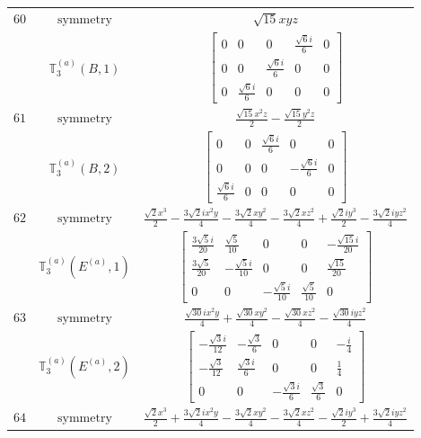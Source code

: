 \documentclass[fleqn,8pt,landscape]{jsarticle}
\begin{document}
\begin{longtable}{ccc}
$ 60 $ & $ \text{symmetry} $ & $ \sqrt{15} x y z $ \\
$  $ & $ \mathbb{T}_{3}^{(a)}(B,1) $ & $ \begin{bmatrix} 0 & 0 & 0 & \frac{\sqrt{6} i}{6} & 0 \\ 0 & 0 & \frac{\sqrt{6} i}{6} & 0 & 0 \\ 0 & \frac{\sqrt{6} i}{6} & 0 & 0 & 0 \end{bmatrix} $ \\ \hline
$ 61 $ & $ \text{symmetry} $ & $ \frac{\sqrt{15} x^{2} z}{2} - \frac{\sqrt{15} y^{2} z}{2} $ \\
$  $ & $ \mathbb{T}_{3}^{(a)}(B,2) $ & $ \begin{bmatrix} 0 & 0 & \frac{\sqrt{6} i}{6} & 0 & 0 \\ 0 & 0 & 0 & - \frac{\sqrt{6} i}{6} & 0 \\ \frac{\sqrt{6} i}{6} & 0 & 0 & 0 & 0 \end{bmatrix} $ \\ \hline
$ 62 $ & $ \text{symmetry} $ & $ \frac{\sqrt{2} x^{3}}{2} - \frac{3 \sqrt{2} i x^{2} y}{4} - \frac{3 \sqrt{2} x y^{2}}{4} - \frac{3 \sqrt{2} x z^{2}}{4} + \frac{\sqrt{2} i y^{3}}{2} - \frac{3 \sqrt{2} i y z^{2}}{4} $ \\
$  $ & $ \mathbb{T}_{3}^{(a)}(E^{(a)},1) $ & $ \begin{bmatrix} \frac{3 \sqrt{5} i}{20} & \frac{\sqrt{5}}{10} & 0 & 0 & - \frac{\sqrt{15} i}{20} \\ \frac{3 \sqrt{5}}{20} & - \frac{\sqrt{5} i}{10} & 0 & 0 & \frac{\sqrt{15}}{20} \\ 0 & 0 & - \frac{\sqrt{5} i}{10} & \frac{\sqrt{5}}{10} & 0 \end{bmatrix} $ \\ \hline
$ 63 $ & $ \text{symmetry} $ & $ \frac{\sqrt{30} i x^{2} y}{4} + \frac{\sqrt{30} x y^{2}}{4} - \frac{\sqrt{30} x z^{2}}{4} - \frac{\sqrt{30} i y z^{2}}{4} $ \\
$  $ & $ \mathbb{T}_{3}^{(a)}(E^{(a)},2) $ & $ \begin{bmatrix} - \frac{\sqrt{3} i}{12} & - \frac{\sqrt{3}}{6} & 0 & 0 & - \frac{i}{4} \\ - \frac{\sqrt{3}}{12} & \frac{\sqrt{3} i}{6} & 0 & 0 & \frac{1}{4} \\ 0 & 0 & - \frac{\sqrt{3} i}{6} & \frac{\sqrt{3}}{6} & 0 \end{bmatrix} $ \\ \hline
$ 64 $ & $ \text{symmetry} $ & $ \frac{\sqrt{2} x^{3}}{2} + \frac{3 \sqrt{2} i x^{2} y}{4} - \frac{3 \sqrt{2} x y^{2}}{4} - \frac{3 \sqrt{2} x z^{2}}{4} - \frac{\sqrt{2} i y^{3}}{2} + \frac{3 \sqrt{2} i y z^{2}}{4} $ \\

\end{longtable}
\end{document}
